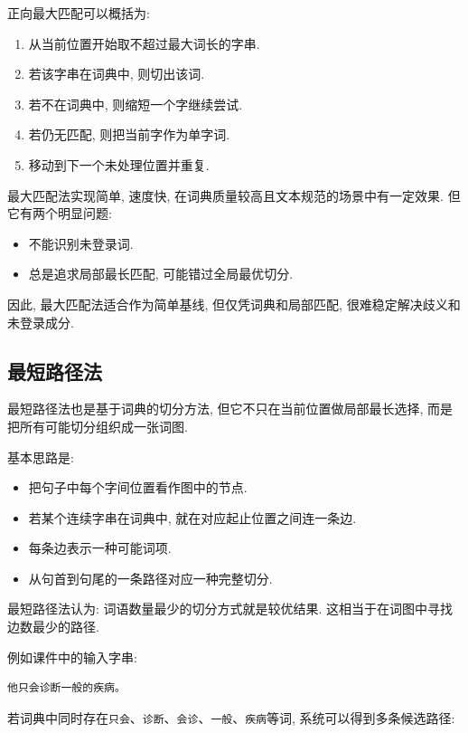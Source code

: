 正向最大匹配可以概括为:

\begin{enumerate}
\item[1.] 从当前位置开始取不超过最大词长的字串.
\item[2.] 若该字串在词典中, 则切出该词.
\item[3.] 若不在词典中, 则缩短一个字继续尝试.
\item[4.] 若仍无匹配, 则把当前字作为单字词.
\item[5.] 移动到下一个未处理位置并重复.
\end{enumerate}

最大匹配法实现简单, 速度快, 在词典质量较高且文本规范的场景中有一定效果.
但它有两个明显问题:

\begin{itemize}
\item 不能识别未登录词.
\item 总是追求局部最长匹配, 可能错过全局最优切分.
\end{itemize}

因此, 最大匹配法适合作为简单基线, 但仅凭词典和局部匹配, 很难稳定解决歧义和未登录成分.

\subsection{最短路径法}


最短路径法也是基于词典的切分方法, 但它不只在当前位置做局部最长选择, 而是把所有可能切分组织成一张词图.

基本思路是:

\begin{itemize}
\item 把句子中每个字间位置看作图中的节点.
\item 若某个连续字串在词典中, 就在对应起止位置之间连一条边.
\item 每条边表示一种可能词项.
\item 从句首到句尾的一条路径对应一种完整切分.
\end{itemize}

最短路径法认为: 词语数量最少的切分方式就是较优结果.
这相当于在词图中寻找边数最少的路径.

例如课件中的输入字串:

\begin{Verbatim}[breaklines=true,breakanywhere=true,fontsize=\small]
他只会诊断一般的疾病。
\end{Verbatim}

若词典中同时存在\texttt{只会}、\texttt{诊断}、\texttt{会诊}、\texttt{一般}、\texttt{疾病}等词,
系统可以得到多条候选路径:

